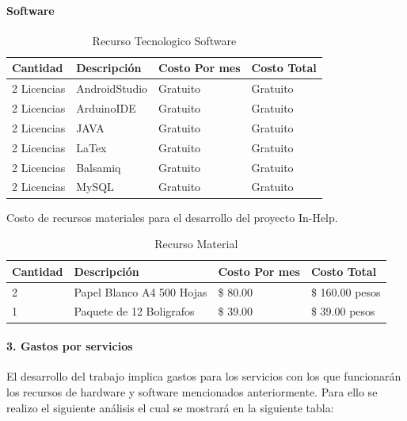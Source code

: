 \paragraph{Software} 
\begin{table}[h!]
\begin{tabular}{|p{2cm}|p{4cm}|p{4cm}|p{4cm}|}
\hline
\textbf{Cantidad}& \textbf{Descripción}&\textbf{Costo Por mes}& \textbf{Costo Total}\\
\hline
\hline
2 Licencias & AndroidStudio & Gratuito & Gratuito \\
\hline
\hline
2 Licencias & ArduinoIDE & Gratuito & Gratuito \\
\hline
\hline
2 Licencias & JAVA & Gratuito & Gratuito \\
\hline
\hline
2 Licencias & LaTex & Gratuito & Gratuito \\
\hline
\hline
2 Licencias & Balsamiq & Gratuito & Gratuito \\
\hline
\hline
2 Licencias & MySQL & Gratuito & Gratuito \\
\hline
\end{tabular}
\caption{Recurso Tecnologico Software}
\label{disenoEstructura:RecTecSF}
\end{table}

Costo de recursos materiales para el desarrollo del proyecto In-Help.\\
\begin{table}[h!]
\begin{tabular}{|p{2cm}|p{4cm}|p{4cm}|p{4cm}|}
\hline
\textbf{Cantidad}& \textbf{Descripción}&\textbf{Costo Por mes}& \textbf{Costo Total}\\
\hline
\hline
2 & Papel Blanco A4 500 Hojas & \$ 80.00 & \$ 160.00 pesos \\
\hline
\hline
1 & Paquete de 12 Boligrafos & \$ 39.00 & \$ 39.00  pesos\\
\hline
\end{tabular}
\caption{Recurso Material}
\label{disenoEstructura:RecMaterial}
\end{table}
\newpage
\paragraph{3. Gastos por servicios} 
El desarrollo del trabajo implica gastos para los servicios con los que funcionarán los recursos de hardware y software mencionados anteriormente. Para ello se realizo el siguiente análisis el cual se mostrará en la siguiente tabla:
